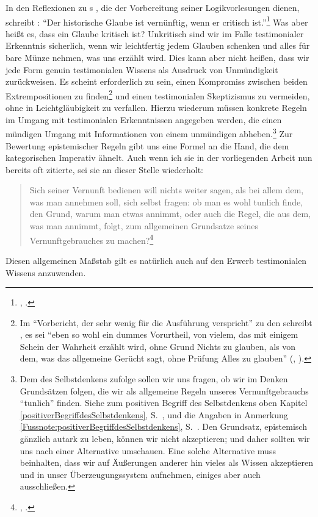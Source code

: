 In den Reflexionen zu s , die der Vorbereitung seiner Logikvorlesungen dienen, schreibt
:
\enquote{Der historische Glaube ist vernünftig, wenn er critisch
ist.}\footnote{\cite[][]{Kant:Reflexionen1900ff.}, \cite[][XVI:
501.4]{Kant:GesammelteWerke1900ff.}.} Was aber heißt es, dass ein Glaube
kritisch ist? Unkritisch sind wir im Falle testimonialer Erkenntnis sicherlich,
wenn wir leichtfertig jedem Glauben schenken und alles für bare Münze nehmen,
was uns erzählt wird. Dies kann aber nicht heißen, dass wir jede Form genuin
testimonialen Wissens als Ausdruck von Unmündigkeit zurückweisen. Es scheint
erforderlich zu sein, einen Kompromiss zwischen beiden Extrempositionen zu finden\footnote{Im
\enquote{Vorbericht, der sehr wenig für die Ausführung verspricht} zu den
 schreibt , es sei \enquote{eben
so wohl ein dummes Vorurtheil, von vielem, das mit einigem Schein der Wahrheit
erzählt wird, ohne Grund Nichts zu glauben, als von dem, was das allgemeine
Gerücht sagt, ohne Prüfung Alles zu glauben}
(\cite[][A~5]{Kant:TraeumeeinesGeisterseherserlaeutertdurchTraeumederMetaphysik1968},
\cite[][II: 318.9--12]{Kant:GesammelteWerke1900ff.}).} und einen testimonialen
Skeptizismus zu vermeiden, ohne in Leichtgläubigkeit zu verfallen. Hierzu
wiederum müssen konkrete Regeln im Umgang mit testimonialen Erkenntnissen
angegeben werden, die einen mündigen Umgang mit Informationen von einem unmündigen
abheben.\footnote{Dem  des Selbstdenkens zufolge
sollen wir uns fragen, ob wir im Denken Grundsätzen folgen, die wir als
allgemeine Regeln unseres Vernunftgebrauchs \enquote{tunlich} finden. Siehe zum
positiven Begriff des Selbstdenkens oben Kapitel
\ref{positiverBegriffdesSelbstdenkens},
S.~\pageref{positiverBegriffdesSelbstdenkens}, und die Angaben in Anmerkung
\ref{Fussnote:positiverBegriffdesSelbstdenkens},
S.~\pageref{Fussnote:positiverBegriffdesSelbstdenkens}. Den Grundsatz,
epistemisch gänzlich autark zu leben, können wir nicht akzeptieren; und daher
sollten wir uns nach einer Alternative umschauen.
Eine solche Alternative muss beinhalten, dass wir auf Äußerungen anderer hin
vieles als Wissen akzeptieren und in unser Überzeugungssystem aufnehmen, einiges
aber auch ausschließen.} Zur Bewertung epistemischer Regeln gibt uns
 eine Formel an die Hand, die dem kategorischen Imperativ
ähnelt. Auch wenn ich sie in der vorliegenden Arbeit nun bereits oft zitierte,
sei sie an dieser Stelle wiederholt:
\begin{quote}
  Sich seiner  Vernunft bedienen will nichts weiter sagen, als bei
  allem dem, was man annehmen soll, sich selbst fragen: ob man es wohl tunlich
  finde, den Grund, warum man etwas annimmt, oder auch die Regel, die aus dem,
  was man annimmt, folgt, zum allgemeinen Grundsatze seines Vernunftgebrauches
  zu
  machen?\footnote{\cite[][A~229]{Kant:Washeisst:SichimDenkenorientieren?1977},
  \cite[][VIII: 146--7]{Kant:GesammelteWerke1900ff.}.}
\end{quote}
Diesen allgemeinen Maßstab gilt es natürlich auch auf den Erwerb testimonialen
Wissens anzuwenden.

